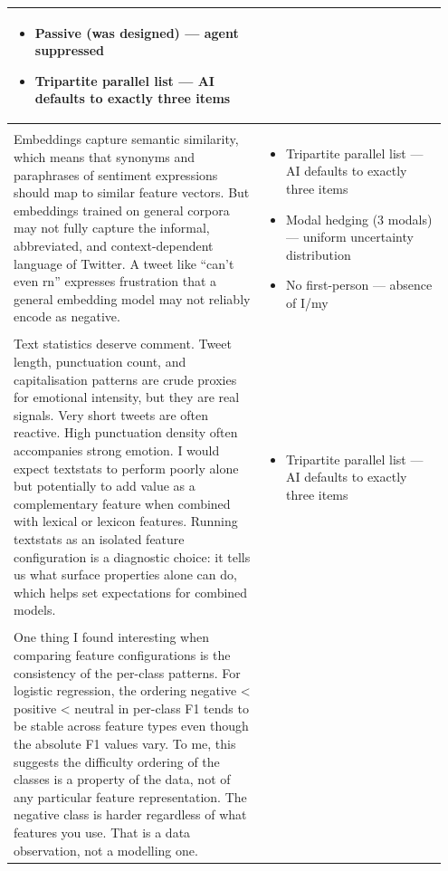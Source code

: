 \documentclass[11pt]{article}
\begin{document}
\begin{longtable}{|p{0.55\linewidth}|p{0.40\linewidth}|}
\begin{itemize}[leftmargin=1em,itemsep=1pt,topsep=1pt,parsep=0pt]
  \item Passive (was designed) --- agent suppressed
  \item Tripartite parallel list --- AI defaults to exactly three items
\end{itemize} \\[2pt]
\hline
\rule{0pt}{3.5cm} & \\
\hline
Embeddings capture semantic similarity, which means that synonyms and paraphrases of sentiment expressions should map to similar feature vectors. But embeddings trained on general corpora may not fully capture the informal, abbreviated, and context-dependent language of Twitter. A tweet like ``can't even rn'' expresses frustration that a general embedding model may not reliably encode as negative. & \begin{itemize}[leftmargin=1em,itemsep=1pt,topsep=1pt,parsep=0pt]
  \item Tripartite parallel list --- AI defaults to exactly three items
  \item Modal hedging (3 modals) --- uniform uncertainty distribution
  \item No first-person --- absence of I/my
\end{itemize} \\[2pt]
\hline
\rule{0pt}{3.5cm} & \\
\hline
Text statistics deserve comment. Tweet length, punctuation count, and capitalisation patterns are crude proxies for emotional intensity, but they are real signals. Very short tweets are often reactive. High punctuation density often accompanies strong emotion. I would expect textstats to perform poorly alone but potentially to add value as a complementary feature when combined with lexical or lexicon features. Running textstats as an isolated feature configuration is a diagnostic choice: it tells us what surface properties alone can do, which helps set expectations for combined models. & \begin{itemize}[leftmargin=1em,itemsep=1pt,topsep=1pt,parsep=0pt]
  \item Tripartite parallel list --- AI defaults to exactly three items
\end{itemize} \\[2pt]
\hline
\rule{0pt}{3.5cm} & \\
\hline
One thing I found interesting when comparing feature configurations is the consistency of the per-class patterns. For logistic regression, the ordering negative < positive < neutral in per-class F1 tends to be stable across feature types even though the absolute F1 values vary. To me, this suggests the difficulty ordering of the classes is a property of the data, not of any particular feature representation. The negative class is harder regardless of what features you use. That is a data observation, not a modelling one. &  \\[2pt]

\end{longtable}
\end{document}
